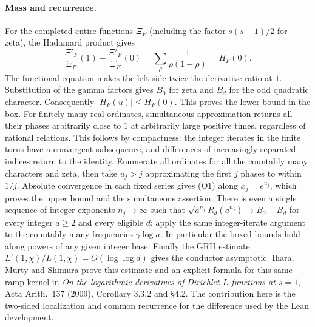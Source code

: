 \paragraph{Mass and recurrence.}
For the completed entire functions $\Xi_F$ (including the factor
$s(s-1)/2$ for zeta), the Hadamard product gives
\[
 \frac{\Xi'_F}{\Xi_F}(1)-\frac{\Xi'_F}{\Xi_F}(0)
    =\sum_{\rho}\frac{1}{\rho(1-\rho)}
    =H_F(0).
\]
The functional equation makes the left side twice the derivative
ratio at $1$. Substitution of the gamma factors gives $B_0$ for zeta
and $B_d$ for the odd quadratic character.
Consequently $|H_F(u)|\le H_F(0)$. This proves the lower bound in the box.
For finitely many real ordinates, simultaneous approximation returns
all their phases arbitrarily close to $1$ at arbitrarily large positive
times, regardless of rational relations. This follows by compactness:
the integer iterates in the finite torus have a convergent subsequence,
and differences of increasingly separated indices return to the identity.
Enumerate all ordinates for all the countably many characters and zeta,
then take $u_j>j$ approximating the first $j$ phases to within $1/j$.
Absolute convergence in each fixed series gives (O1) along $x_j=e^{u_j}$,
which proves the upper bound and the simultaneous assertion. There is
even a single sequence of integer exponents $n_j\to\infty$ such that
$\sqrt{a^{n_j}}R_d(a^{n_j})\to B_0-B_d$ for every integer $a\ge2$
and every eligible $d$: apply the same integer-iterate argument to the
countably many frequencies $\gamma\log a$. In particular the boxed bounds
hold along powers of any given integer base. Finally
the GRH estimate $L'(1,\chi)/L(1,\chi)=O(\log\log d)$ gives the conductor
asymptotic. Ihara, Murty and Shimura prove this estimate and an explicit
formula for this same ramp kernel in
\href{https://www.impan.pl/shop/en/publication/transaction/download/product/82940}
{\emph{On the logarithmic derivatives of Dirichlet $L$-functions at $s=1$}},
Acta Arith.\ 137 (2009), Corollary 3.3.2 and \S4.2. The contribution
here is the two-sided localization and common recurrence for the
difference used by the Lean development.

